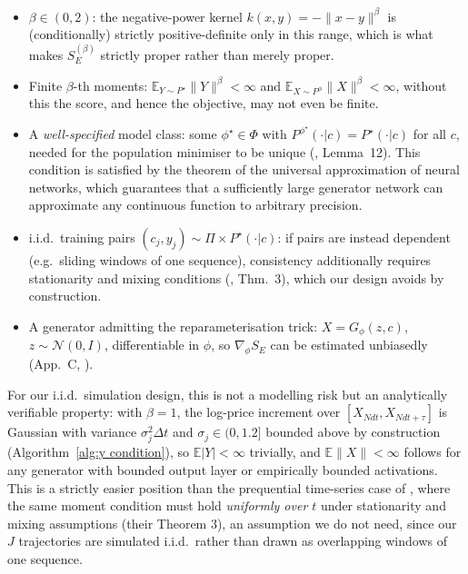 \begin{itemize}
\label{scoring_rule_assumptions}
\item $\beta\in(0,2)$: the negative-power kernel $k(x,y)=-\|x-y\|^\beta$ is (conditionally) strictly positive-definite only in this range, which is what makes $S_E^{(\beta)}$ strictly proper rather than merely proper.
\item Finite $\beta$-th moments: $\mathbb{E}_{Y\sim P^\star}\|Y\|^\beta<\infty$ and $\mathbb{E}_{X\sim P^\phi}\|X\|^\beta<\infty$, without this the score, and hence the objective, may not even be finite.
\item A \emph{well-specified} model class: some $\phi^\star\in\Phi$ with $P^{\phi^\star}(\cdot|c)=P^\star(\cdot|c)$ for all $c$, needed for the population minimiser to be unique (\cite{srforgan:srforgan}, Lemma~12). This condition is satisfied by the theorem of the universal approximation of neural networks, 
which guarantees that a sufficiently large generator network can approximate any continuous function to arbitrary precision.
\item i.i.d.\ training pairs $(c_j,y_j)\sim\Pi\times P^\star(\cdot|c)$: if pairs are instead dependent (e.g.\ sliding windows of one sequence), consistency additionally requires stationarity and mixing conditions (\cite{srforgan:srforgan}, Thm.~3), which our design avoids by construction.
\item A generator admitting the reparameterisation trick: $X=G_\phi(z,c)$, $z\sim\mathcal N(0,I)$, differentiable in $\phi$, so $\nabla_\phi S_E$ can be estimated unbiasedly (App.~C, \cite{srforgan:srforgan}).
\end{itemize}



For our i.i.d.\ simulation 
design, this is not a modelling risk but an analytically verifiable property: 
with $\beta=1$, the log-price increment over $[X_{Ndt},X_{Ndt+\tau}]$ is Gaussian
 with variance $\sigma_j^2\Delta t$ and $\sigma_j\in(0,1.2]$ bounded above by 
 construction (Algorithm~\ref{alg:y condition}), so $\mathbb{E}|Y|<\infty$ trivially, 
 and $\mathbb{E}\|X\|<\infty$ follows for any generator with bounded output layer or 
 empirically bounded activations. This is a strictly easier position than the 
 prequential time-series case of \cite{srforgan:srforgan}, where the same 
 moment condition must hold \emph{uniformly over $t$} under stationarity and 
 mixing assumptions (their Theorem 3), an assumption we do not need, since our 
 $J$ trajectories are simulated i.i.d.\ rather than drawn as overlapping windows 
 of one sequence.\\

